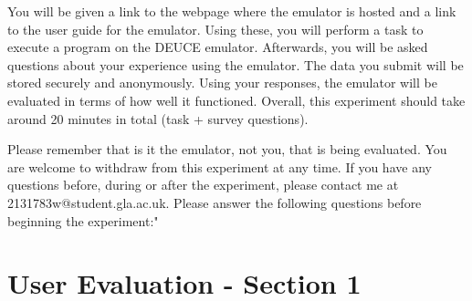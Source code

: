 \documentclass{l4proj}
\begin{document}
\begin{appendices}
You will be given a link to the webpage where the emulator is hosted and a link to the user guide for the emulator. Using these, you will perform a task to execute a program on the DEUCE emulator. Afterwards, you will be asked questions about your experience using the emulator. The data you submit will be stored securely and anonymously. Using your responses, the emulator will be evaluated in terms of how well it functioned. Overall, this experiment should take around 20 minutes in total (task + survey questions).

Please remember that is it the emulator, not you, that is being evaluated. You are welcome to withdraw from this experiment at any time. If you have any questions before, during or after the experiment, please contact me at 2131783w@student.gla.ac.uk. Please answer the following questions before beginning the experiment:"

\clearpage
\section{User Evaluation - Section 1}


\end{appendices}
\end{document}
